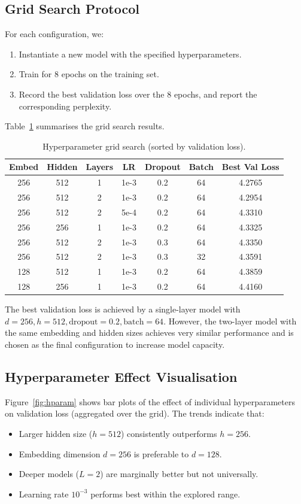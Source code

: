 \documentclass[runningheads]{llncs}
\begin{document}
\subsection{Grid Search Protocol}
For each configuration, we:
\begin{enumerate}
    \item Instantiate a new model with the specified hyperparameters.
    \item Train for 8 epochs on the training set.
    \item Record the best validation loss over the 8 epochs, and report the corresponding perplexity.
\end{enumerate}
Table~\ref{tab:hparam} summarises the grid search results.

\begin{table}[t]
\centering
\caption{Hyperparameter grid search (sorted by validation loss).}
\label{tab:hparam}
\begin{tabular}{@{}ccccccc@{}}
\toprule
Embed & Hidden & Layers & LR & Dropout & Batch & Best Val Loss \\
\midrule
256 & 512 & 1 & 1e-3  & 0.2 & 64 & 4.2765 \\
256 & 512 & 2 & 1e-3  & 0.2 & 64 & 4.2954 \\
256 & 512 & 2 & 5e-4 & 0.2 & 64 & 4.3310 \\
256 & 256 & 1 & 1e-3  & 0.2 & 64 & 4.3325 \\
256 & 512 & 2 & 1e-3  & 0.3 & 64 & 4.3350 \\
256 & 512 & 2 & 1e-3  & 0.3 & 32 & 4.3591 \\
128 & 512 & 1 & 1e-3  & 0.2 & 64 & 4.3859 \\
128 & 256 & 1 & 1e-3  & 0.2 & 64 & 4.4160 \\
\bottomrule
\end{tabular}
\end{table}

The best validation loss is achieved by a single-layer model with \(d=256, h=512, \text{dropout}=0.2, \text{batch}=64\).
However, the two-layer model with the same embedding and hidden sizes achieves very similar performance and is chosen as the final configuration to increase model capacity.

\subsection{Hyperparameter Effect Visualisation}
Figure~\ref{fig:hparam} shows bar plots of the effect of individual hyperparameters on validation loss (aggregated over the grid).
The trends indicate that:
\begin{itemize}
    \item Larger hidden size (\(h=512\)) consistently outperforms \(h=256\).
    \item Embedding dimension \(d=256\) is preferable to \(d=128\).
    \item Deeper models (\(L=2\)) are marginally better but not universally.
    \item Learning rate \(10^{-3}\) performs best within the explored range.
\end{itemize}
\end{document}
